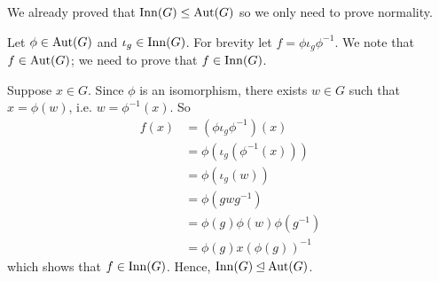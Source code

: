 \begin{questions}
    \item We already proved that $\mathrm{Inn}(G) \leq \mathrm{Aut}(G)$ so we only need to prove normality.

    Let $\phi \in \mathrm{Aut}(G)$ and $\iota_g \in \mathrm{Inn}(G)$. For brevity let $f = \phi\iota_g\phi^{-1}$. We note that $f \in \mathrm{Aut}(G)$; we need to prove that $f \in \mathrm{Inn}(G)$.

    Suppose $x \in G$. Since $\phi$ is an isomorphism, there exists $w \in G$ such that $x = \phi(w)$, i.e. $w = \phi^{-1}(x)$. So
    \begin{align*}
        f(x) &= \left(\phi\iota_g\phi^{-1}\right)(x)\\
        &= \phi(\iota_g(\phi^{-1}(x)))\\
        &= \phi(\iota_g(w))\\
        &= \phi(gwg^{-1})\\
        &= \phi(g)\phi(w)\phi(g^{-1})\\
        &= \phi(g)x\left(\phi(g)\right)^{-1}
    \end{align*}
    which shows that $f \in \mathrm{Inn}(G)$. Hence, $\mathrm{Inn}(G) \unlhd \mathrm{Aut}(G)$.
\end{questions}


